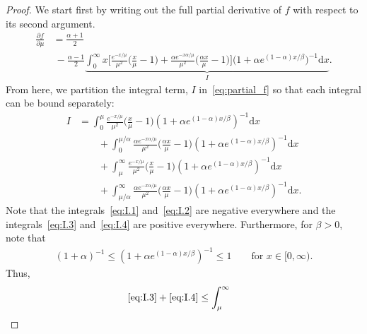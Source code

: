 \documentclass[runningheads]{llncs}
\newcommand{\diff}{\mathrm{d}}
\begin{document}
\begin{subappendices}
\begin{proof}
    We start first by writing out the full partial derivative of $f$ with
    respect to its second argument.
    \begin{align}
      \label{eq:partial_f}
      \frac{\partial f}{\partial \mu}
      &
      = \frac{\alpha +1}{2}
      \\
      & \
      - \frac{\alpha -1}{2}
      \underbrace{\int_0^\infty x
      \Big[
      \frac{e^{-x/\mu}}{\mu^2} \big(\frac{x}{\mu} - 1\big)
      +\frac{\alpha e^{-x\alpha / \mu}}{\mu^2} \big(\frac{\alpha x}{\mu}-1\big)
      \Big]
      \big(1+\alpha e ^{(1-\alpha)x/\beta}\big)^{-1} \diff x}_{I}.
        \nonumber
    \end{align}
    From here, we partition the integral term, $I$ in~\eqref{eq:partial_f}
    so that each integral can be bound separately:
    \begin{align}
      I &=
          \int_0^\mu
          \frac{e^{-x/\mu}}{\mu^2}\Big( \frac{x}{\mu} - 1\Big)
          (1+\alpha e ^{(1-\alpha)x/\beta})^{-1} \diff x
          \tag{I.1}
          \label{eq:I.1}
      \\
        & \qquad
          + \int_0^{\mu / \alpha}
          \frac{\alpha e^{-x \alpha /\mu}}{\mu^2}\Big( \frac{\alpha x}{\mu} - 1\Big)
          (1+\alpha e ^{(1-\alpha)x/\beta})^{-1} \diff x
          \tag{I.2}
          \label{eq:I.2}
      \\ & \qquad
           +\int_\mu^\infty
           \frac{e^{-x/\mu}}{\mu^2} \Big( \frac{x}{\mu} - 1\Big)
           (1+\alpha e ^{(1-\alpha)x/\beta})^{-1} \diff x
           \tag{I.3}
           \label{eq:I.3}
      \\
        & \qquad
          + \int_{\mu / \alpha}^\infty
          \frac{\alpha e^{-x \alpha /\mu}}{\mu^2}\Big( \frac{\alpha x}{\mu} - 1\Big)
          (1+\alpha e ^{(1-\alpha)x/\beta})^{-1} \diff x.
          \label{eq:I.4}
          \tag{I.4}
    \end{align}
    Note that the integrals~\eqref{eq:I.1} and~\eqref{eq:I.2} are negative
    everywhere and the integrals~\eqref{eq:I.3} and~\eqref{eq:I.4} are positive
    everywhere. Furthermore, for $\beta>0$, note that
    \begin{align*}
      (1+\alpha)^{-1}
      \leq (1 + \alpha e^{(1-\alpha)x / \beta})^{-1}
      \leq 1
      \qquad
      \text{for } x \in [0, \infty).
    \end{align*}
    Thus,
    \begin{align*}
        \eqref{eq:I.3} +\eqref{eq:I.4}
      &\leq \int_\mu^\infty

\end{align*}
\end{proof}
\end{subappendices}
\end{document}
